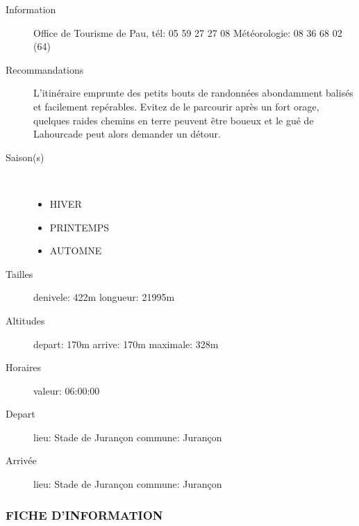 \documentclass[titlepage]{article}
\begin{document}
        \begin{description}
        \item[Information]{Office de Tourisme de Pau, tél: 05 59 27 27 08 Météorologie: 08 36 68 02 (64)}
        \item[Recommandations]{L'itinéraire emprunte des petits bouts de randonnées abondamment balisés et facilement repérables. Evitez de le parcourir après un fort orage, quelques raides chemins en terre peuvent être boueux et le gué de Lahourcade peut alors demander un détour.}
        \item[Saison(s)]~\\{\begin{itemize}
        \item{HIVER}
    
        \item{PRINTEMPS}
    
        \item{AUTOMNE}
    \end{itemize}}
        \item[Tailles]{denivele:
        422m longueur:
        21995m }
        \item[Altitudes]{depart:
        170m arrive:
        170m maximale:
        328m }
        \item[Horaires]{valeur:
        06:00:00 }
        \item[Depart]{lieu:
        Stade de Jurançon commune:
        Jurançon }
        \item[Arrivée]{lieu:
        Stade de Jurançon commune:
        Jurançon }
        \end{description}
    
        \subsubsection{FICHE D'INFORMATION}
    
\end{document}
